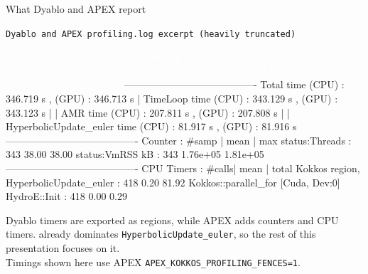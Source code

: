 \documentclass[11pt]{beamer}
\begin{document}
\begin{frame}[fragile,t]{What Dyablo and APEX report}
\begin{beamerboxesrounded}[upper=terminal title,lower=terminal body,width=\linewidth,shadow=false]{%
\textcolor{red!70}{\footnotesize\textbullet}\hspace{0.15em}%
\textcolor{yellow!80}{\footnotesize\textbullet}\hspace{0.15em}%
\textcolor{green!70!black}{\footnotesize\textbullet}\hspace{0.55em}%
\texttt{\scriptsize Dyablo and APEX profiling.log excerpt (heavily truncated)}}
{\ttfamily\tiny\color{termText}
\begin{semiverbatim}
\textcolor{white}{APEX Version: v2.7.1-2bd7ac2c-develop}
\textcolor{white}{Executing command line: ./dyablo test_sod_3D.ini}
\textcolor{white}{KOKKOS CONFIG}
\textcolor{white}{  Kokkos Version: 5.0.0}
  \textcolor{white}{  Default Device: Cuda}
  \textcolor{white}{  GPU architecture: ADA89}
----------------------------------------
\textcolor{hlOrange}{Total                         time (CPU) :   346.719 s , (GPU) :   346.713 s}
\textcolor{hlOrange}{| TimeLoop                    time (CPU) :   343.129 s , (GPU) :   343.123 s}
\textcolor{hlOrange}{| | AMR                       time (CPU) :   207.811 s , (GPU) :   207.808 s}
\textcolor{hlOrange}{| | HyperbolicUpdate_euler    time (CPU) :    81.917 s , (GPU) :    81.916 s}
----------------------------------------
\textcolor{hotspotBlue}{Counter                                              :  #samp |   mean  |  max}
\textcolor{hotspotBlue}{                                      status:Threads :    343    38.00    38.00}
\textcolor{hotspotBlue}{                                     status:VmRSS kB :    343 1.76e+05 1.81e+05}
----------------------------------------
\textcolor{hotspotBlue}{CPU Timers                                           : #calls|   mean |   total}
\textcolor{hotspotBlue}{               Kokkos region, HyperbolicUpdate_euler :    418     0.20    81.92}
\textcolor{hotspotBlue}{     Kokkos::parallel_for [Cuda, Dev:0] HydroE::Init :    418     0.00     0.29}
\end{semiverbatim}}
\end{beamerboxesrounded}
\vspace{0.1em}
{\scriptsize \textcolor{hlOrange}{Dyablo timers} are exported as regions, while \textcolor{hotspotBlue}{APEX} adds counters and CPU timers.  already dominates \texttt{HyperbolicUpdate\_euler}, so the rest of this presentation focuses on it.\\}
{\tiny Timings shown here use APEX \texttt{APEX\_KOKKOS\_PROFILING\_FENCES=1}.}
\end{frame}
\end{document}
